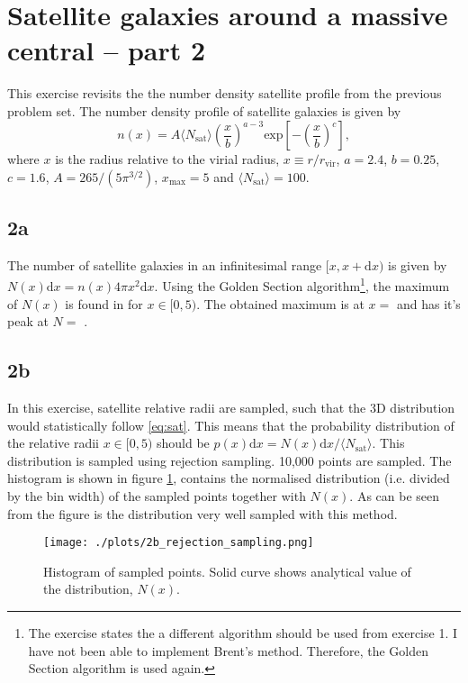\section{Satellite galaxies around a massive central – part 2}
This exercise revisits the the number density satellite profile from the previous problem set. The number density profile of satellite galaxies is given by
\begin{equation}\label{eq:sat}
  n(x) = A \langle N_\mathrm{sat}\rangle \left( \frac{x}{b} \right) ^{a-3} \mathrm{exp} \left[ - \left( \frac{x}{b} \right)^{c} \right],
\end{equation}
where $x$ is the radius relative to the virial radius, $x\equiv r/r_\mathrm{vir}$, $a = 2.4$, $b = 0.25$, $c = 1.6$, $A=265/(5\pi^{3/2})$, $x_\mathrm{max}=5$ and $\langle N_\mathrm{sat} \rangle = 100$.

\subsection*{2a}
The number of satellite galaxies in an infinitesimal range $[x,x+\mathrm{d}x)$ is given by $N(x)\mathrm{d}x = n(x)4\pi x^2\mathrm{d}x$. Using the Golden Section algorithm\footnote{The exercise states the a different algorithm should be used from exercise 1. I have not been able to implement Brent's method. Therefore, the Golden Section algorithm is used again.}, the maximum of $N(x)$ is found in for $x \in [0,5)$. The obtained maximum is at $x =$  and has it's peak at $N = $ .

\subsection*{2b}\label{sec:2b}
In this exercise, satellite relative radii are sampled, such that the 3D distribution would statistically follow \ref{eq:sat}. This means that the probability distribution of the relative radii $x \in [0,5)$ should be $p(x)\mathrm{d}x = N(x)\mathrm{d}x/\langle N_\mathrm{sat} \rangle$. This distribution is sampled using rejection sampling. 10,000 points are sampled. The histogram is shown in figure \ref{fig:2b}, contains the normalised distribution (i.e. divided by the bin width) of the sampled points together with $N(x)$. As can be seen from the figure is the distribution very well sampled with this method.

\begin{figure}[!ht]
  \centering
  \texttt{[image: ./plots/2b\_rejection\_sampling.png]}
  \caption{Histogram of sampled points. Solid curve shows analytical value of the distribution, $N(x)$.}
  \label{fig:2b}
\end{figure}

